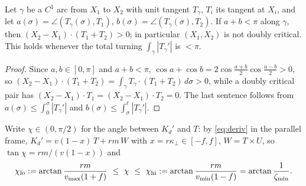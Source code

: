 
\begin{lemma}\label{lem:turn}
Let $\gamma$ be a $C^1$ arc from $X_1$ to $X_2$ with unit tangent $T_\gamma$, $T_i$ its tangent at $X_i$, and let
$a(\sigma)=\angle(T_\gamma(\sigma),T_1)$, $b(\sigma)=\angle(T_\gamma(\sigma),T_2)$. If $a+b<\pi$ along $\gamma$, then
$(X_2-X_1)\cdot(T_1+T_2)>0$; in particular $(X_1,X_2)$ is not doubly critical. This holds whenever the total turning
$\int_\gamma|T_\gamma'|$ is $<\pi$.
\end{lemma}
\begin{proof}
Since $a,b\in[0,\pi]$ and $a+b<\pi$, $\cos a+\cos b=2\cos\frac{a+b}2\cos\frac{a-b}2>0$, so
$(X_2-X_1)\cdot(T_1+T_2)=\int_\gamma T_\gamma\cdot(T_1+T_2)\,d\sigma>0$, while a doubly critical pair has
$(X_2-X_1)\cdot T_1=(X_2-X_1)\cdot T_2=0$. The last sentence follows from $a(\sigma)\le\int_0^\sigma|T_\gamma'|$ and
$b(\sigma)\le\int_\sigma^{\ell}|T_\gamma'|$.
\end{proof}

\noindent Write $\chi\in(0,\pi/2)$ for the angle between $K_d'$ and $T$: by \eqref{eq:deriv} in the parallel frame,
$K_d'=v(1-x)\,T+rm\,W$ with $x=r\kappa_\perp\in[-f,f]$, $W=T\times U$, so $\tan\chi=rm/(v(1-x))$ and
\[
\chi_{\rm lo}:=\arctan\frac{rm}{v_{\max}(1+f)}\ \le\ \chi\ \le\ \chi_{\rm hi}:=\arctan\frac{rm}{v_{\min}(1-f)}=\arctan\frac1{\zeta_{\min}} .
\]

